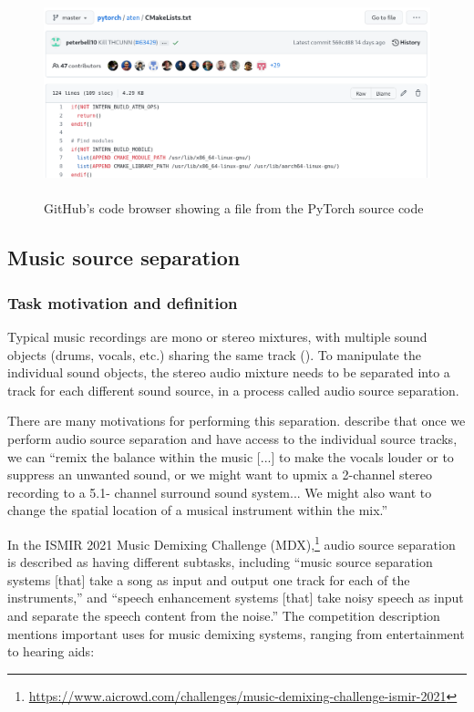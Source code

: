 \documentclass[report.tex]{subfiles}
\begin{document}
\begin{figure}[ht]
	\centering
	\includegraphics[height=6cm]{./images-misc/github.png}
	\caption{GitHub's code browser showing a file from the PyTorch source code}
	\label{fig:githubpytorch}
\end{figure}

\newpagefill

\subsection{Music source separation}
\label{sec:musicsep}

\subsubsection{Task motivation and definition}

Typical music recordings are mono or stereo mixtures, with multiple sound objects (drums, vocals, etc.) sharing the same track (\cite{musicsepintro1}). To manipulate the individual sound objects, the stereo audio mixture needs to be separated into a track for each different sound source, in a process called audio source separation.

There are many motivations for performing this separation. \textcite{musicsepgood} describe that once we perform audio source separation and have access to the individual source tracks, we can ``remix the balance within the music [...] to make the vocals louder or to suppress an unwanted sound, or we might want to upmix a 2-channel stereo recording to a 5.1-
channel surround sound system... We might also want to change the spatial location of a musical instrument within the mix.''

In the ISMIR 2021 Music Demixing Challenge (MDX),\footnote{\url{https://www.aicrowd.com/challenges/music-demixing-challenge-ismir-2021}} audio source separation is described as having different subtasks, including ``music source separation systems [that] take a song as input and output one track for each of the instruments,'' and ``speech enhancement systems [that] take noisy speech as input and separate the speech content from the noise.'' The competition description mentions important uses for music demixing systems, ranging from entertainment to hearing aids:
\end{document}
